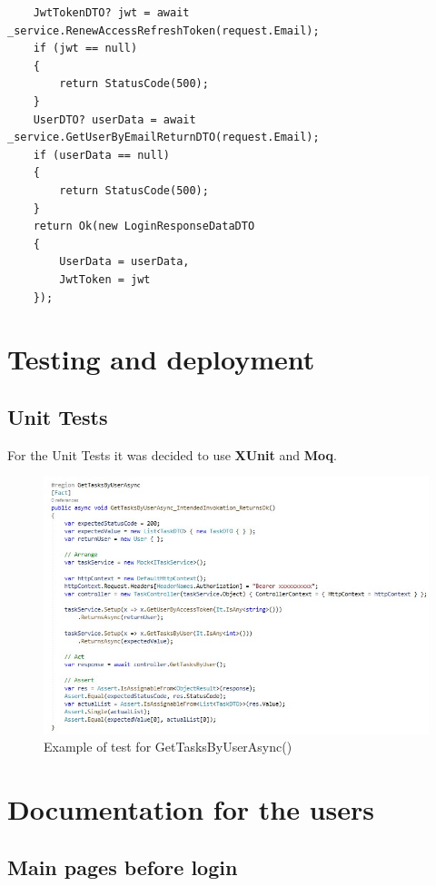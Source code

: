 \documentclass[singlespacing,12pt,parskip,headsepline,consistentlayout]{article}
\begin{document}
\begin{lstlisting}
    JwtTokenDTO? jwt = await _service.RenewAccessRefreshToken(request.Email);
    if (jwt == null)
    {
        return StatusCode(500);
    }
    UserDTO? userData = await _service.GetUserByEmailReturnDTO(request.Email);
    if (userData == null)
    {
        return StatusCode(500);
    }
    return Ok(new LoginResponseDataDTO
    {
        UserData = userData,
        JwtToken = jwt
    });
\end{lstlisting}

\pagebreak

\section{Testing and deployment}

\subsection{Unit Tests}
For the Unit Tests it was decided to use \textbf{XUnit} and \textbf{Moq}.
\begin{figure}[H]
    \centering
    \includegraphics[width=\textwidth,height=\textheight,keepaspectratio]{img/TestExample.jpg}
    \caption{Example of test for GetTasksByUserAsync()}
\end{figure}

\section{Documentation for the users}

\subsection{Main pages before login}
\end{document}
